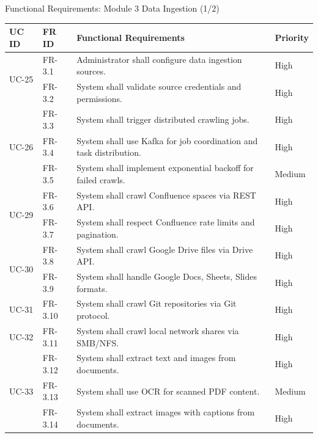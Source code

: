 \documentclass[aspectratio=169,xcolor=dvipsnames]{beamer}
\begin{document}
\begin{frame}{Functional Requirements: Module 3 Data Ingestion (1/2)}
    \tiny
    \renewcommand{\arraystretch}{0.62}
    \begin{table}
        \centering
        \begin{tabular}{p{}|p{}|p{}|p{}}
        \toprule
        \textbf{UC ID} & \textbf{FR ID} & \textbf{Functional Requirements} & \textbf{Priority} \\
        \midrule
        \multirow{2}{*}{UC-25} & FR-3.1 & Administrator shall configure data ingestion sources. & High \\
        & FR-3.2 & System shall validate source credentials and permissions. & High \\
        \midrule
        \multirow{3}{*}{UC-26} & FR-3.3 & System shall trigger distributed crawling jobs. & High \\
        & FR-3.4 & System shall use Kafka for job coordination and task distribution. & High \\
        & FR-3.5 & System shall implement exponential backoff for failed crawls. & Medium \\
        \midrule
        \multirow{2}{*}{UC-29} & FR-3.6 & System shall crawl Confluence spaces via REST API. & High \\
        & FR-3.7 & System shall respect Confluence rate limits and pagination. & High \\
        \midrule
        \multirow{2}{*}{UC-30} & FR-3.8 & System shall crawl Google Drive files via Drive API. & High \\
        & FR-3.9 & System shall handle Google Docs, Sheets, Slides formats. & High \\
        \midrule
        UC-31 & FR-3.10 & System shall crawl Git repositories via Git protocol. & High \\
        \midrule
        UC-32 & FR-3.11 & System shall crawl local network shares via SMB/NFS. & High \\
        \midrule
        \multirow{3}{*}{UC-33} & FR-3.12 & System shall extract text and images from documents. & High \\
        & FR-3.13 & System shall use OCR for scanned PDF content. & Medium \\
        & FR-3.14 & System shall extract images with captions from documents. & High \\
        \bottomrule
        \end{tabular}
    \end{table}
\end{frame}
\end{document}
